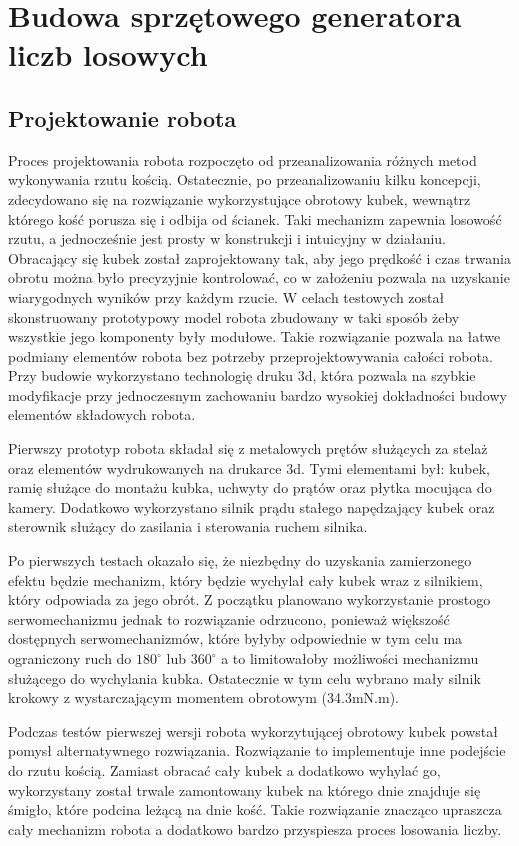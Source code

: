 
\chapter{Budowa sprzętowego generatora liczb losowych}
\section{Projektowanie robota}

Proces projektowania robota rozpoczęto od przeanalizowania różnych metod wykonywania rzutu kością.
Ostatecznie, po przeanalizowaniu kilku koncepcji, zdecydowano się na rozwiązanie wykorzystujące obrotowy 
kubek, wewnątrz którego kość porusza się i odbija od ścianek. Taki mechanizm zapewnia losowość rzutu, a 
jednocześnie jest prosty w konstrukcji i intuicyjny w działaniu. Obracający się kubek został 
zaprojektowany tak, aby jego prędkość i czas trwania obrotu można było precyzyjnie kontrolować, co  w założeniu 
pozwala na uzyskanie wiarygodnych wyników przy każdym rzucie. W celach testowych został skonstruowany prototypowy
model robota zbudowany w taki sposób żeby wszystkie jego komponenty były modułowe. Takie rozwiązanie pozwala na 
łatwe podmiany elementów robota bez potrzeby przeprojektowywania całości robota. Przy budowie wykorzystano 
technologię druku 3d, która pozwala na szybkie modyfikacje przy jednoczesnym zachowaniu bardzo wysokiej dokładności
budowy elementów składowych robota.

Pierwszy prototyp robota składał się z metalowych prętów służących za stelaż oraz elementów wydrukowanych na drukarce 3d.
Tymi elementami był: kubek, ramię służące do montażu kubka, uchwyty do prątów oraz płytka mocująca do kamery. Dodatkowo
wykorzystano silnik prądu stałego napędzający kubek oraz sterownik służący do zasilania i sterowania ruchem silnika.

Po pierwszych testach okazało się, że niezbędny do uzyskania zamierzonego efektu będzie mechanizm, który będzie 
wychylał cały kubek wraz z silnikiem, który odpowiada za jego obrót. Z początku planowano wykorzystanie prostogo
serwomechanizmu jednak to rozwiązanie odrzucono, ponieważ większość dostępnych serwomechanizmów, które byłyby odpowiednie w tym celu ma
ograniczony ruch do $180^{\circ}$ lub $360^{\circ}$ a to limitowałoby możliwości mechanizmu służącego do wychylania kubka.
Ostatecznie w tym celu wybrano mały silnik krokowy z wystarczającym momentem obrotowym (34.3mN.m).

Podczas testów pierwszej wersji robota wykorzytującej obrotowy kubek powstał pomysł alternatywnego rozwiązania.
Rozwiązanie to implementuje inne podejście do rzutu kością. Zamiast obracać cały kubek a dodatkowo wyhylać go,
wykorzystany został trwale zamontowany kubek na którego dnie znajduje się śmigło, które podcina leżącą na dnie kość.
Takie rozwiązanie znacząco upraszcza cały mechanizm robota a dodatkowo bardzo przyspiesza proces losowania liczby.



